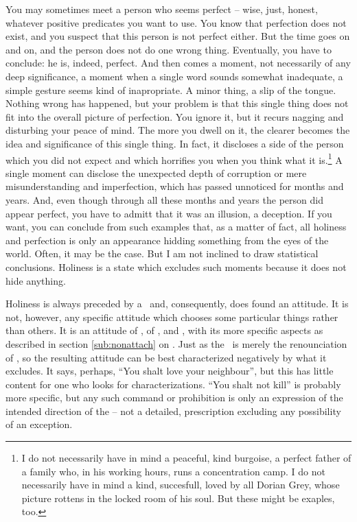 \pa
You may sometimes meet a person who seems perfect -- wise, just, 
honest, whatever positive predicates you want to use. You know that 
perfection does not exist, and you suspect that this person is not 
perfect either. But the time goes on and on, and the person does not 
do one wrong thing. Eventually, you have to conclude: he is, indeed, 
perfect. And then comes a moment, not necessarily of any deep 
significance, a moment when a single word sounds somewhat inadequate, 
a simple gesture seems kind of inapropriate. 
A minor thing, a slip of the tongue. Nothing wrong has happened, but 
your problem is that this single thing does not fit into the overall 
picture of perfection. You ignore it, but it recurs nagging and 
disturbing your peace of mind. The more you dwell on it, the clearer 
becomes the idea and significance of this single thing. In fact, 
it discloses a side of the person which you did not expect and which 
horrifies you when you think what it is.\footnote{I do not 
necessarily have in mind a peaceful, kind burgoise, a perfect father 
of a family who, in his working hours, runs a concentration camp. I 
do not necessarily have in mind a kind, succesfull, loved by all 
Dorian Grey, whose picture rottens in the locked room of his soul. 
But these might be exaples, too.} A single moment can disclose the 
unexpected depth of corruption or mere misunderstanding and 
imperfection, which has passed unnoticed for months and years. And, 
even though through all these months and years the person did appear 
perfect, you have to admitt that it was an illusion, a deception. If 
you want, you can conclude from such examples that, as a matter of 
fact, all holiness and perfection is only an appearance hidding 
something from the eyes of the world. Often, it may be the case. But 
I am not inclined to draw statistical conclusions. Holiness is a 
state which excludes such moments because it does not hide anything. 

\pa Holiness is always preceded by a \sch\ and,
consequently, does found an attitude.  It is not, however, 
any specific attitude which chooses some particular things rather than
others.  It is an attitude of , of ,
 and , with its more specific aspects as
described in section \ref{sub:nonattach} on .  Just
as the \yes\ is merely the renounciation of , so the
resulting attitude can be best characterized negatively by what it
excludes.  It says, perhaps, ``You shalt love your neighbour'', but
this has little content for one who looks for 
characterizations.  ``You shalt not kill'' is probably more specific,
but any such command or prohibition is only an expression of the
intended direction of the  -- not a detailed, 
prescription excluding any possibility of an exception. 

